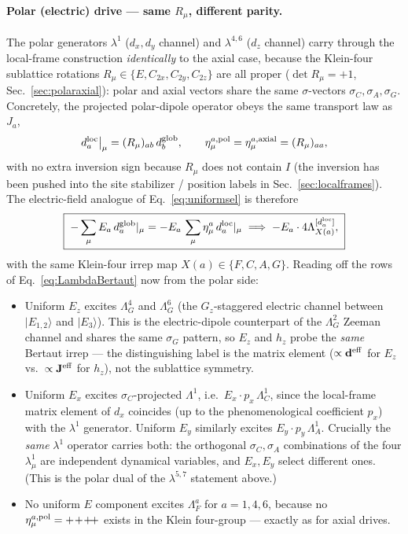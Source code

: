\documentclass[reprint,amsmath,amssymb,aps,prb,longbibliography]{revtex4-2}
\newcommand{\Jeff}{\mathbf{J}^{\rm eff}}
\newcommand{\deff}{\mathbf{d}^{\rm eff}}
\begin{document}
\paragraph{Polar (electric) drive --- same $R_\mu$, different parity.}
The polar generators $\lambda^1$ ($d_x, d_y$ channel) and
$\lambda^{4,6}$ ($d_z$ channel) carry through the local-frame
construction \emph{identically} to the axial case, because the
Klein-four sublattice rotations $R_\mu\in\{E,C_{2x},C_{2y},C_{2z}\}$
are all proper ($\det R_\mu = +1$, Sec.~\ref{sec:polaraxial}): polar
and axial vectors share the same $\sigma$-vectors $\sigma_C, \sigma_A,
\sigma_G$. Concretely, the projected polar-dipole operator obeys the
same transport law as $J_a$,
\begin{equation}
d_a^{\rm loc}\big|_\mu = (R_\mu)_{ab}\,d_b^{\rm glob},\qquad
\eta^{a,\rm pol}_\mu = \eta^{a,\rm axial}_\mu = (R_\mu)_{aa},
\label{eq:dlocal}
\end{equation}
with no extra inversion sign because $R_\mu$ does not contain $I$
(the inversion has been pushed into the site stabilizer / position
labels in Sec.~\ref{sec:localframes}). The electric-field analogue
of Eq.~\eqref{eq:uniformsel} is therefore
\begin{equation}
\boxed{\;-\sum_\mu E_a\,d_a^{\rm glob}|_\mu
= -E_a\,\sum_\mu \eta^a_\mu\,d_a^{\rm loc}|_\mu
\;\Longrightarrow\; -E_a\cdot 4\Lambda^{[d_a^{\rm loc}]}_{X(a)},\;}
\label{eq:uniformselE}
\end{equation}
with the same Klein-four irrep map $X(a)\in\{F,C,A,G\}$. Reading off
the rows of Eq.~\eqref{eq:LambdaBertaut} now from the polar side:
\begin{itemize}[leftmargin=*]
\item Uniform $E_z$ excites $\Lambda^4_G$ and $\Lambda^6_G$
(the $G_z$-staggered electric channel between $|E_{1,2}\rangle$ and
$|E_3\rangle$). This is the electric-dipole counterpart of the
$\Lambda^2_G$ Zeeman channel and shares the same $\sigma_G$ pattern,
so $E_z$ and $h_z$ probe the \emph{same} Bertaut irrep --- the
distinguishing label is the matrix element ($\propto \deff$ for $E_z$
vs.\ $\propto\Jeff$ for $h_z$), not the sublattice symmetry.
\item Uniform $E_x$ excites $\sigma_C$-projected $\Lambda^1$, i.e.\
$E_x\cdot p_x\,\Lambda^1_C$, since the local-frame matrix element of
$d_x$ coincides (up to the phenomenological coefficient $p_x$) with
the $\lambda^1$ generator. Uniform $E_y$ similarly excites
$E_y\cdot p_y\,\Lambda^1_A$. Crucially the \emph{same} $\lambda^1$
operator carries both: the orthogonal $\sigma_{C}, \sigma_A$
combinations of the four $\lambda^1_\mu$ are independent dynamical
variables, and $E_x, E_y$ select different ones. (This is the polar
dual of the $\lambda^{5,7}$ statement above.)
\item No uniform $E$ component excites $\Lambda^a_F$ for $a=1,4,6$,
because no $\eta^{a,\rm pol}_\mu = +\!+\!+\!+$ exists in the Klein
four-group --- exactly as for axial drives.
\end{itemize}
\end{document}
